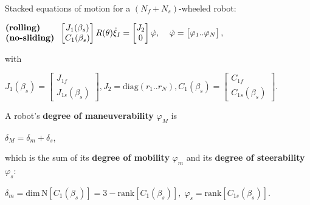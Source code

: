 \documentclass[landscape]{article}
\newcommand{\vmspace}{\vspace{-7pt}}
\newcommand{\vpspace}{\vspace{5pt}}
\begin{document}
\begin{multicols}{3}
\begin{minipage}{\columnwidth}
  Stacked equations of motion for a $(N_f+N_s)$-wheeled robot:
  \vmspace
  \begin{center}
    $\begin{matrix}
      \text{\textbf{(rolling)}}\;\;\;\;\;\; \\
      \text{\textbf{(no-sliding)}}
    \end{matrix}\;\;
    \left[\begin{matrix}
      J_1(\beta_s) \\
      C_1(\beta_s)
    \end{matrix}\right]
    R(\theta)\dot\xi_I
    =
    \left[\begin{matrix}
      J_2 \\
      0
    \end{matrix}\right]
    \dot\varphi,\;\;\;\;
    \dot\varphi
    =
    \left[\begin{matrix}
      \varphi_1..\varphi_N
    \end{matrix}\right],$
  \end{center}
\end{minipage}

\begin{minipage}{\columnwidth}
  with
  \vmspace
  \begin{center}
    $J_1(\beta_s)
    =
    \left[\begin{matrix}
      J_{1f} \\
      J_{1s}(\beta_s)
    \end{matrix}\right],
    J_2
    =
    \mathrm{diag}(r_1..r_N),
    C_1(\beta_s)
    =
    \left[\begin{matrix}
      C_{1f} \\
      C_{1s}(\beta_s)
    \end{matrix}\right].$
  \end{center}
\end{minipage}

\vpspace

\begin{minipage}{\columnwidth}
  A robot's \textbf{degree of maneuverability} $\varphi_M$ is
  \vmspace
  \begin{center}
    $\delta_M = \delta_m + \delta_s$,
  \end{center}
  \vmspace
  which is the sum of its \textbf{degree of mobility} $\varphi_m$ and its
  \textbf{degree of steerability} $\varphi_s$:
  \vmspace
  \begin{center}
    $\delta_m=\mathrm{dim}\,\mathrm{N}\left[C_1(\beta_s)\right] = 3 -
    \mathrm{rank}\left[C_1(\beta_s)\right],\;
    \varphi_s = \mathrm{rank}\left[C_{1s}(\beta_s)\right].$
  \end{center}
\end{minipage}


\end{multicols}
\end{document}
